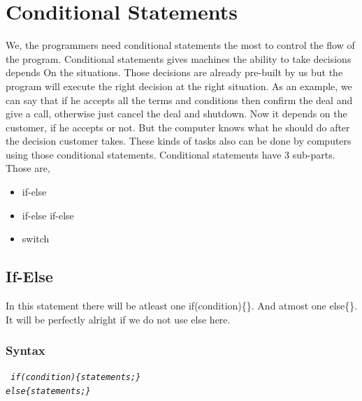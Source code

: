 \documentclass[openany]{book}  %
\begin{document}
\section{Conditional Statements}
We, the programmers need conditional statements the most to control the flow of the program. Conditional statements gives machines the ability to take decisions depends On
the situations. Those decisions are already pre-built by us but the program will execute the right decision at the right situation. As an example, we can say that if he accepts
all the terms and conditions then confirm the deal and give a call, otherwise just cancel the deal and shutdown. Now it depends on the customer, if he accepts or not.
But the computer knows what he should do after the decision customer takes. These kinds of tasks also can be done by computers using those conditional
statements. Conditional statements have 3 sub-parts. Those are,
\begin{itemize}
    \item if-else
    \item if-else if-else
    \item switch
\end{itemize}
% 
% 
\subsection{If-Else}
In this statement there will be atleast one if(condition)\{\}. And atmost one else\{\}. It will be perfectly alright if we do not use else here.
% 
% 
\subsubsection{Syntax}
\begin{center}
    \tt{
        \textit{if(condition)\{statements;\}\\else\{statements;\}}
    }
\end{center}

\newpage

% 
% 
\end{document}
